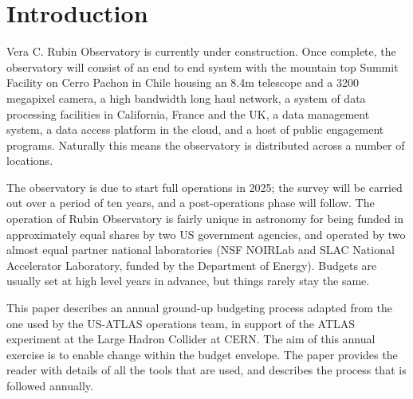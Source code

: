 \section{Introduction} \label{sec:intro}
Vera C. Rubin Observatory\cite{2008arXiv0805.2366I} is currently under construction. 
Once complete, the observatory will consist of an end to end system with the mountain top Summit Facility on Cerro Pachon in Chile housing an 8.4m telescope and a 3200 megapixel camera, a high bandwidth long haul network, a system of data processing facilities in California, France and the UK, a data management system, a data access platform in the cloud, and a host of public engagement programs. 
Naturally this means the observatory is distributed across a number of locations. 

The observatory is due to start full operations in 2025; the survey will be carried out over a period of ten years, and a post-operations phase will follow. 
The operation of Rubin Observatory is fairly unique in astronomy for being funded in approximately equal shares by two US government agencies, and operated by two almost equal partner national laboratories (NSF NOIRLab and SLAC National Accelerator Laboratory, funded by the Department of Energy). 
Budgets are usually set at high level years in advance, but things rarely stay the same.

This paper describes an annual ground-up budgeting process adapted from the one used by the US-ATLAS operations team, in support of the ATLAS experiment at the Large Hadron Collider at CERN. 
The aim of this annual exercise is to enable change within the budget envelope.
The paper provides the reader with details of all the tools that are used, and describes the process that is followed annually.
